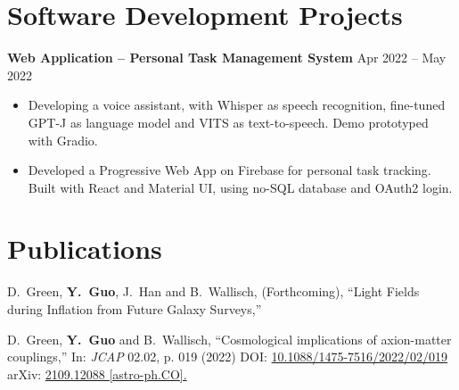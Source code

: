 \documentclass[letterpaper,12pt]{article}
\newenvironment{zitemize}{
\begin{itemize} \vspace{-.9em}\itemsep 0pt \parskip 0pt}
{\end{itemize}\vspace{-.5em}}
\newcommand{\proglang}[1]{#1}
\begin{document}
\section{Software Development Projects}

\textbf{Web Application -- Personal Task Management System} \hfill Apr 2022 -- May 2022 \\
\begin{zitemize}
    \item Developing a voice assistant, with \proglang{Whisper} as speech recognition, fine-tuned \proglang{GPT-J} as language model and \proglang{VITS} as text-to-speech. Demo prototyped with \proglang{Gradio}.
    \item Developed a Progressive Web App on \proglang{Firebase} for personal task tracking. Built with \proglang{React} and \proglang{Material UI}, using \proglang{no-SQL} database and \proglang{OAuth2} login. 
\end{zitemize}


\section{Publications}

D.~Green, \textbf{Y.~Guo}, J.~Han and B.~Wallisch, (Forthcoming),
``Light Fields during Inflation from Future Galaxy Surveys,''

D.~Green, \textbf{Y.~Guo} and B.~Wallisch,
``Cosmological implications of axion-matter couplings,''
In: \textit{JCAP} 02.02, p. 019 (2022)
DOI: \href{https://iopscience.iop.org/article/10.1088/1475-7516/2022/02/019}{10.1088/1475-7516/2022/02/019}
arXiv: \href{https://arxiv.org/abs/2109.12088?context=hep-ph}{2109.12088 [astro-ph.CO].}
\end{document}
